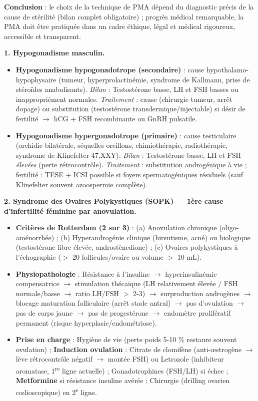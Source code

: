 \documentclass[11pt]{article}
\begin{document}
\begin{exoresolu}
\textbf{Conclusion} : le choix de la technique de PMA dépend du diagnostic précis de la cause de stérilité (bilan complet obligatoire) ; progrès médical remarquable, la PMA doit être pratiquée dans un cadre éthique, légal et médical rigoureux, accessible et transparent.
\end{exoresolu}

\begin{exemplebox}
\textbf{1. Hypogonadisme masculin.}
\begin{itemize}
\item \textbf{Hypogonadisme hypogonadotrope (secondaire)} : cause hypothalamo-hypophysaire (tumeur, hyperprolactinémie, syndrome de Kallmann, prise de stéroïdes anabolisants). \emph{Bilan} : Testostérone basse, LH et FSH basses ou inappropriément normales. \emph{Traitement} : cause (chirurgie tumeur, arrêt dopage) ou substitution (testostérone transdermique/injectable) si désir de fertilité $\rightarrow$ hCG + FSH recombinante ou GnRH pulsatile.
\item \textbf{Hypogonadisme hypergonadotrope (primaire)} : cause testiculaire (orchidie bilatérale, séquelles oreillons, chimiothérapie, radiothérapie, syndrome de Klinefelter 47,XXY). \emph{Bilan} : Testostérone basse, LH et FSH \emph{élevées} (perte rétrocontrôle). \emph{Traitement} : substitution androgénique à vie ; fertilité : TESE + ICSI possible si foyers spermatogéniques résiduels (sauf Klinefelter souvent azoospermie complète).
\end{itemize}

\textbf{2. Syndrome des Ovaires Polykystiques (SOPK) — 1ère cause d'infertilité féminine par anovulation.}
\begin{itemize}
\item \textbf{Critères de Rotterdam (2 sur 3)} : (a) Anovulation chronique (oligo-aménorrhée) ; (b) Hyperandrogénie clinique (hirsutisme, acné) ou biologique (testostérone libre élevée, androstènedione) ; (c) Ovaires polykystiques à l'échographie ($>$ 20 follicules/ovaire ou volume $>$ 10 mL).
\item \textbf{Physiopathologie} : Résistance à l'insuline $\rightarrow$ hyperinsulinémie compensatrice $\rightarrow$ stimulation thécaïque (LH relativement élevée / FSH normale/basse $\rightarrow$ ratio LH/FSH $>$ 2-3) $\rightarrow$ surproduction androgènes $\rightarrow$ blocage maturation folliculaire (arrêt stade antral) $\rightarrow$ pas d'ovulation $\rightarrow$ pas de corps jaune $\rightarrow$ pas de progestérone $\rightarrow$ endomètre prolifératif permanent (risque hyperplasie/endométriose).
\item \textbf{Prise en charge} : Hygiène de vie (perte poids 5-10 \% restaure souvent ovulation) ; \textbf{Induction ovulation} : Citrate de clomifène (anti-œstrogène $\rightarrow$ lève rétrocontrôle négatif $\rightarrow$ montée FSH) ou Letrozole (inhibiteur aromatase, 1\textsuperscript{re} ligne actuelle) ; Gonadotrophines (FSH/LH) si échec ; \textbf{Metformine} si résistance insuline avérée ; Chirurgie (drilling ovarien cœlioscopique) en 2\textsuperscript{e} ligne.
\end{itemize}


\end{exemplebox}
\end{document}
